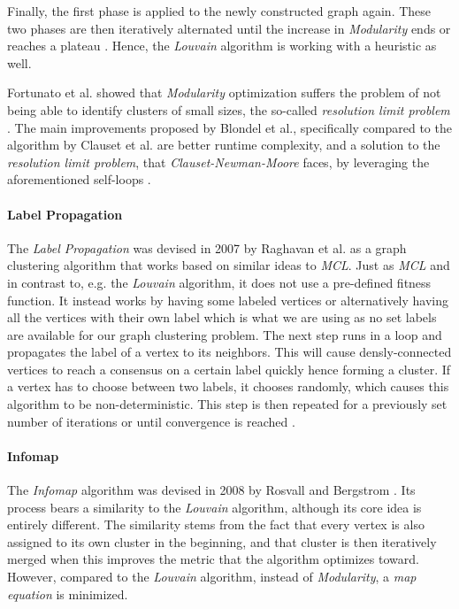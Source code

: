 \documentclass[12pt,a4paper]{report}
\begin{document}
Finally, the first phase is applied to the newly constructed graph again. These
two phases are then iteratively alternated until the increase in \textit{
Modularity} ends or reaches a plateau \cite{blondel2008modularity}. Hence, the
\textit{Louvain} algorithm is working with a heuristic as well.

Fortunato et al. showed that \textit{Modularity} optimization suffers the
problem of not being able to identify clusters of small sizes, the so-called
\textit{resolution limit problem} \cite{fortunato2007resolution}. The main
improvements proposed by Blondel et al., specifically compared to the algorithm
by Clauset et al. are better runtime complexity, and a solution to the \textit{
resolution limit problem}, that \textit{Clauset-Newman-Moore} faces, by
leveraging the aforementioned self-loops \cite{blondel2008modularity}.

\paragraph{Label Propagation \cite{raghavan2007lpa}}
The \textit{Label Propagation} was devised in 2007 by Raghavan et al.
as a graph clustering algorithm that works based on similar ideas to \textit{MCL}.
Just as \textit{MCL} and in contrast to, e.g. the \textit{Louvain} algorithm,
it does not use a pre\hyp defined fitness function.
It instead works by having some labeled
vertices or alternatively having all the vertices with their own label which is
what we are using as no set labels are available for our graph clustering
problem. The next step runs in a loop and propagates the label of a vertex to
its neighbors. This will cause densly\hyp connected vertices to reach a
consensus on a certain label quickly hence forming a cluster. If a vertex has
to choose between two labels, it chooses randomly, which causes this algorithm
to be non\hyp deterministic. This step is then repeated for a previously set
number of iterations or until convergence is reached \cite{raghavan2007lpa}.

\paragraph{Infomap \cite{rosvall2008infomap}}
The \textit{Infomap} algorithm
was devised in 2008 by Rosvall and Bergstrom \cite{rosvall2008infomap}. Its
process bears a similarity to the \textit{Louvain} algorithm, although its core
idea is entirely different. The similarity stems from the fact that every
vertex is also assigned to its own cluster in the beginning, and that cluster
is then iteratively merged when this improves the metric that the algorithm
optimizes toward. However, compared to the \textit{Louvain} algorithm, instead
of \textit{Modularity}, a \textit{map equation} is minimized.
\end{document}
